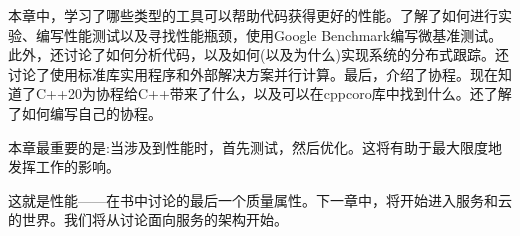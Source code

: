 本章中，学习了哪些类型的工具可以帮助代码获得更好的性能。了解了如何进行实验、编写性能测试以及寻找性能瓶颈，使用Google Benchmark编写微基准测试。此外，还讨论了如何分析代码，以及如何(以及为什么)实现系统的分布式跟踪。还讨论了使用标准库实用程序和外部解决方案并行计算。最后，介绍了协程。现在知道了C++20为协程给C++带来了什么，以及可以在cppcoro库中找到什么。还了解了如何编写自己的协程。

本章最重要的是:当涉及到性能时，首先测试，然后优化。这将有助于最大限度地发挥工作的影响。

这就是性能——在书中讨论的最后一个质量属性。下一章中，将开始进入服务和云的世界。我们将从讨论面向服务的架构开始。
























